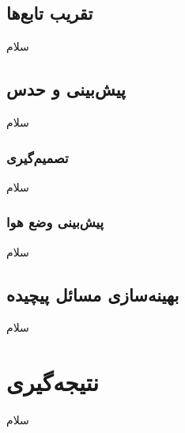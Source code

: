 \documentclass[11pt,a4paper,twocolumn]{article}
\begin{document}
\subsection{تقریب تابع‌ها}
سلام
\subsection{پیش‌بینی و حدس}
سلام
\subsubsection{تصمیم‌گیری}
سلام
\subsubsection{پیش‌بینی وضع هوا}
سلام
\subsection{بهینه‌سازی مسائل پیچیده}
سلام
\section{نتیجه‌گیری}
سلام
\end{document}
